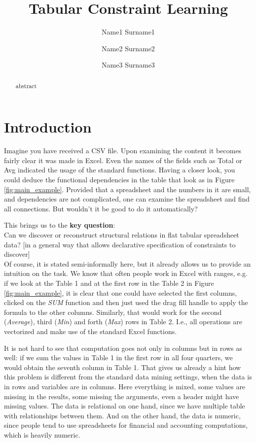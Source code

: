 \documentclass{ecai}
\begin{document}
\title{Tabular Constraint Learning}

\author{Name1 Surname1 \and Name2 Surname2 \and Name3 Surname3  }

\maketitle

\begin{abstract}
  abstract
\end{abstract}
\section{Introduction}
Imagine you have received a CSV file. Upon examining the content it becomes fairly clear it was made in Excel. Even the names of the fields such as Total or Avg indicated the usage of the standard functions. Having a closer look, you could deduce the functional dependencies in the table that look as in Figure \ref{fig:main_example}. Provided that a spreadsheet and the numbers in it are small, and dependencies are not complicated, one can examine the spreadsheet and find all connections. But wouldn't it be good to do it automatically?

This brings us to the \textbf{key question}:\\
Can we discover or reconstruct structural relations in flat tabular spreadsheet data? [in a general way that allows declarative specification of constraints to discover]\\

Of course, it is stated semi-informally here, but it already allows us to provide an intuition on the task. We know that often people work in Excel with ranges, e.g. if we look at the Table 1  and at the first row in the Table 2 in Figure \ref{fig:main_example}, it is clear that one could have selected the first columns, clicked on the \textit{SUM} function and then just used the drag fill handle to apply the formula to the other columns. Similarly, that would work for the second (\textit{Average}), third (\textit{Min})  and forth (\textit{Max}) rows in Table 2. I.e., all operations are vectorized and make use of the standard Excel functions. 

It is not hard to see that computation goes not only in columns but in rows as well: if we sum the values in Table 1 in the first row in all four quarters, we would obtain the seventh column in Table 1. That gives us already a hint how this problem is different from the standard data mining settings, when the data is in rows and variables are in columns. Here everything is mixed, some values are missing in the results, some missing the arguments, even a header might have missing values. The data is relational on one hand, since we have multiple table with relationships between them. And on the other hand, the data is numeric, since people tend to use spreadsheets for financial and accounting computations, which is heavily numeric.
\end{document}
